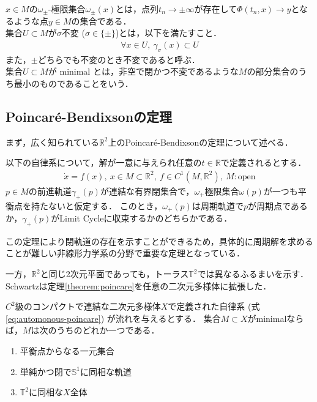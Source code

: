 \documentclass[../main]{subfiles}
\begin{document}
$x\in M$の$\omega_\pm$-極限集合$\omega_\pm(x)$とは，点列$t_n\to \pm\infty$が存在して$\Phi(t_n,x)\to y$となるような点$y\in M$の集合である．\\
集合$U\subset M$が$\sigma$不変 ($\sigma\in\{\pm\}$)とは，以下を満たすこと．
\begin{align*}
    \forall x\in U,\ \gamma_\sigma (x)\subset U
\end{align*}
また，$\pm$どちらでも不変のとき不変であると呼ぶ．\\
集合$U\subset M$が minimal とは，非空で閉かつ不変であるような$M$の部分集合のうち最小のものであることをいう．
\subsection{Poincar\'{e}-Bendixsonの定理}
まず，広く知られている$\mathbb{R}^2$上のPoincar\'{e}-Bendixsonの定理について述べる．
\begin{theorem}
    以下の自律系について，解が一意に与えられ任意の$t\in\mathbb{R}$で定義されるとする．
    \begin{align}
        \dot{x}=f(x),\ x\in M\subset \mathbb{R}^2,\ f\in C^1(M,\mathbb{R}^2),\ M:\mathrm{open}         \label{eq:automonous-poincare}
    \end{align}
    $p\in M$の前進軌道$\gamma_+(p)$が連結な有界閉集合で，$\omega_+$極限集合$\omega(p)$が一つも平衡点を持たないと仮定する．
    このとき，$\omega_+(p)$は周期軌道で$p$が周期点であるか，$\gamma_+(p)$がLimit Cycleに収束するかのどちらかである．
    \label{theorem:poincare}
\end{theorem}
この定理により閉軌道の存在を示すことができるため，具体的に周期解を求めることが難しい非線形力学系の分野で重要な定理となっている．

一方，$\mathbb{R}^2$と同じ2次元平面であっても，トーラス$\mathbb{T}^2$では異なるふるまいを示す．
Schwartzは定理\ref{theorem:poincare}を任意の二次元多様体に拡張した\cite{Schwartz1963ErrataAG}．
\begin{theorem}
    \label{thm:poiben-gen}
    $C^2$級のコンパクトで連結な二次元多様体$X$で定義された自律系 (式\eqref{eq:automonous-poincare}) が流れを与えるとする．
    集合$M\subset X$がminimalならば，$M$は次のうちのどれか一つである．
    \begin{enumerate}
        \item 平衡点からなる一元集合
        \item 単純かつ閉で$\mathbb{S}^1$に同相な軌道
        \item $\mathbb{T}^2$に同相な$X$全体
    \end{enumerate}
\end{theorem}
\end{document}
